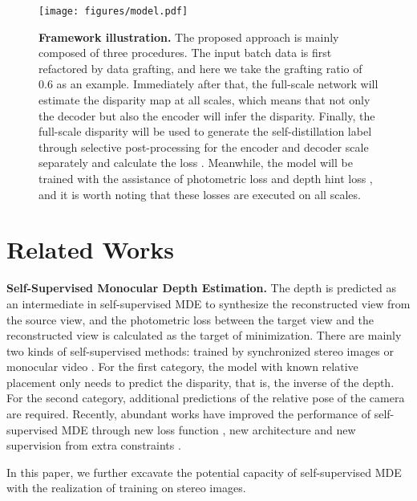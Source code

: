 \documentclass[10pt,twocolumn,letterpaper]{article}
\begin{document}
\begin{figure*}
   \begin{center}
      \texttt{[image: figures/model.pdf]}
   \end{center}
   \caption{{\bf Framework illustration.} The proposed approach is mainly composed of three 
   procedures. The input batch data is first refactored by data grafting, and here we take 
   the grafting ratio of 0.6 as an example. Immediately after that, the full-scale network 
   will estimate the disparity map at all scales, which means that not only the decoder 
   but also the encoder will infer the disparity. Finally, the full-scale disparity will 
   be used to generate the self-distillation label through selective post-processing for 
   the encoder and decoder scale separately and calculate the loss . Meanwhile, 
   the model will be trained with the assistance of photometric loss  and depth 
   hint loss , and it is worth noting that these losses are executed on all scales.}
   \label{fig:framework}
\end{figure*}

\section{Related Works}

\noindent
{\bf Self-Supervised Monocular Depth Estimation.} The depth is predicted as 
an intermediate in self-supervised MDE to synthesize the reconstructed view from 
the source view, and the photometric loss between the target view 
and the reconstructed view is calculated as the target of minimization. There are 
mainly two kinds of self-supervised methods: trained by synchronized stereo 
images \cite{Garg2016,Godard2017,Pilzer2019,Watson2019,Zhu2020} or 
monocular video \cite{Zhou2017,Yin2018,Chen2019,Shu2020}. For the first category, 
the model with known relative placement only needs to 
predict the disparity, that is, the inverse of the depth. For the second category, 
additional predictions of the relative pose of the camera are required. Recently, 
abundant works have improved the performance of self-supervised MDE 
through new loss function 
\cite{Garg2016,Watson2019,Godard2019,Shu2020,Zhu2020}, new architecture 
\cite{Pilzer2019,Zhou2019,Yu2020,Guizilini2020,Lyu2021} and new supervision from 
extra constraints 
\cite{Yang2018,Yin2018,Ranjan2019,Chen2019,Klingner2020,Zhu2020, Guizilini2020Sem}.

In this paper, we further excavate the potential capacity of self-supervised 
MDE with the realization of training on stereo images.
\end{document}

